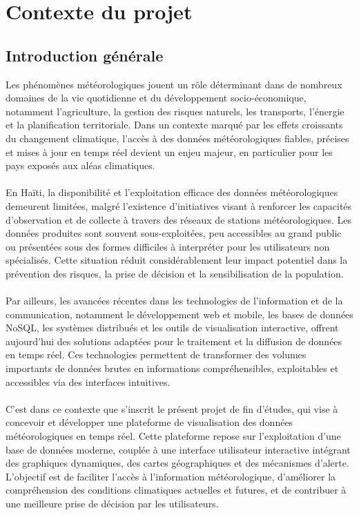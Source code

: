 
\chapter{Contexte du projet}


\section{Introduction générale }
Les phénomènes météorologiques jouent un rôle déterminant dans de nombreux domaines de la vie quotidienne et du développement socio-économique, notamment l’agriculture, la gestion des risques naturels, les transports, l’énergie et la planification territoriale. Dans un contexte marqué par les effets croissants du changement climatique, l’accès à des données météorologiques fiables, précises et mises à jour en temps réel devient un enjeu majeur, en particulier pour les pays exposés aux aléas climatiques.\\ \\
En Haïti, la disponibilité et l’exploitation efficace des données météorologiques demeurent limitées, malgré l’existence d’initiatives visant à renforcer les capacités d’observation et de collecte à travers des réseaux de stations météorologiques. Les données produites sont souvent sous-exploitées, peu accessibles au grand public ou présentées sous des formes difficiles à interpréter pour les utilisateurs non spécialisés. Cette situation réduit considérablement leur impact potentiel dans la prévention des risques, la prise de décision et la sensibilisation de la population.\\ \\
Par ailleurs, les avancées récentes dans les technologies de l’information et de la communication, notamment le développement web et mobile, les bases de données NoSQL, les systèmes distribués et les outils de visualisation interactive, offrent aujourd’hui des solutions adaptées pour le traitement et la diffusion de données en temps réel. Ces technologies permettent de transformer des volumes importants de données brutes en informations compréhensibles, exploitables et accessibles via des interfaces intuitives.\\ \\
C’est dans ce contexte que s’inscrit le présent projet de fin d’études, qui vise à concevoir et développer une plateforme de visualisation des données météorologiques en temps réel. Cette plateforme repose sur l’exploitation d’une base de données moderne, couplée à une interface utilisateur interactive intégrant des graphiques dynamiques, des cartes géographiques et des mécanismes d’alerte. L’objectif est de faciliter l’accès à l’information météorologique, d’améliorer la compréhension des conditions climatiques actuelles et futures, et de contribuer à une meilleure prise de décision par les utilisateurs.\\ \\
